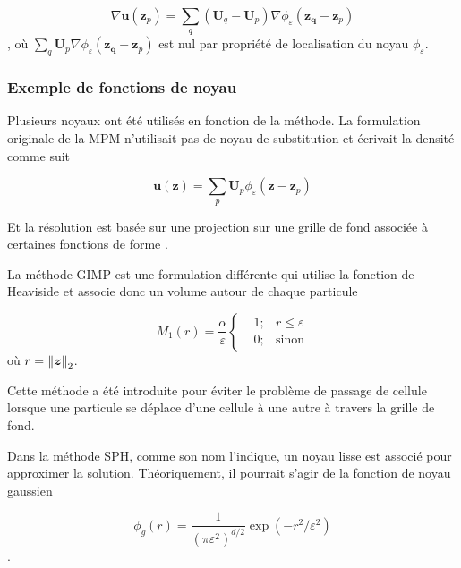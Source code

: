 \begin{equation*}
    \nabla \bm{u}(\bm{z}_p) = \sum_q (\bm{U}_q - \bm{U}_p) \nabla \phi_\varepsilon (\bm{z_q}-\bm{z}_p)
\end{equation*}, où $\sum_q \bm{U}_p \nabla \phi_\varepsilon (\bm{z_q}-\bm{z}_p)$ est nul par propriété de localisation du noyau $\phi_\varepsilon$.


\subsubsection{Exemple de fonctions de noyau}

Plusieurs noyaux ont été utilisés en fonction de la méthode. La formulation originale de la MPM n'utilisait pas de noyau de substitution et écrivait la densité comme suit

\begin{equation*}
    \bm{u}(\bm{z}) = \sum_p \bm{U}_p \phi_\varepsilon (\bm{z}-\bm{z}_p)
\end{equation*}

Et la résolution est basée sur une projection sur une grille de fond associée à certaines fonctions de forme \cite{sulsky_particle_1994}.

La méthode GIMP est une formulation différente qui utilise la fonction de Heaviside \cite{bardenhagen_generalized_2004} et associe donc un volume autour de chaque particule

\begin{equation*}
    M_1(r) = \frac{\alpha}{\varepsilon}\left\{\begin{aligned}
         & 1; & r \leq \varepsilon \\
         & 0; & \text{sinon}
    \end{aligned}
    \right.
\end{equation*}où $r = \left\lVert \bm{z} \right\rVert_2$.

Cette méthode a été introduite pour éviter le problème de passage de cellule lorsque une particule se déplace d'une cellule à une autre à travers la grille de fond.

Dans la méthode SPH, comme son nom l'indique, un noyau lisse est associé pour approximer la solution. Théoriquement, il pourrait s'agir de la fonction de noyau gaussien

\begin{equation*}
    \phi_g(r) = \frac{1}{{(\pi \varepsilon^2)}^{d/2}} \exp(-r^2/\varepsilon^2)
\end{equation*}.

